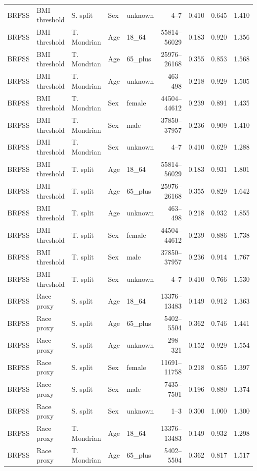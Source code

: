 \begin{longtable}{L{0.9cm}L{1.55cm}L{1.45cm}L{1.1cm}L{1.8cm}r r r r}
BRFSS & BMI threshold & S. split & Sex & unknown & 4--7 & 0.410 & 0.645 & 1.410 \\
BRFSS & BMI threshold & T. Mondrian & Age & 18\_64 & 55814--56029 & 0.183 & 0.920 & 1.356 \\
BRFSS & BMI threshold & T. Mondrian & Age & 65\_plus & 25976--26168 & 0.355 & 0.853 & 1.568 \\
BRFSS & BMI threshold & T. Mondrian & Age & unknown & 463--498 & 0.218 & 0.929 & 1.505 \\
BRFSS & BMI threshold & T. Mondrian & Sex & female & 44504--44612 & 0.239 & 0.891 & 1.435 \\
BRFSS & BMI threshold & T. Mondrian & Sex & male & 37850--37957 & 0.236 & 0.909 & 1.410 \\
BRFSS & BMI threshold & T. Mondrian & Sex & unknown & 4--7 & 0.410 & 0.629 & 1.288 \\
BRFSS & BMI threshold & T. split & Age & 18\_64 & 55814--56029 & 0.183 & 0.931 & 1.801 \\
BRFSS & BMI threshold & T. split & Age & 65\_plus & 25976--26168 & 0.355 & 0.829 & 1.642 \\
BRFSS & BMI threshold & T. split & Age & unknown & 463--498 & 0.218 & 0.932 & 1.855 \\
BRFSS & BMI threshold & T. split & Sex & female & 44504--44612 & 0.239 & 0.886 & 1.738 \\
BRFSS & BMI threshold & T. split & Sex & male & 37850--37957 & 0.236 & 0.914 & 1.767 \\
BRFSS & BMI threshold & T. split & Sex & unknown & 4--7 & 0.410 & 0.766 & 1.530 \\
BRFSS & Race proxy & S. split & Age & 18\_64 & 13376--13483 & 0.149 & 0.912 & 1.363 \\
BRFSS & Race proxy & S. split & Age & 65\_plus & 5402--5504 & 0.362 & 0.746 & 1.441 \\
BRFSS & Race proxy & S. split & Age & unknown & 298--321 & 0.152 & 0.929 & 1.554 \\
BRFSS & Race proxy & S. split & Sex & female & 11691--11758 & 0.218 & 0.855 & 1.397 \\
BRFSS & Race proxy & S. split & Sex & male & 7435--7501 & 0.196 & 0.880 & 1.374 \\
BRFSS & Race proxy & S. split & Sex & unknown & 1--3 & 0.300 & 1.000 & 1.300 \\
BRFSS & Race proxy & T. Mondrian & Age & 18\_64 & 13376--13483 & 0.149 & 0.932 & 1.298 \\
BRFSS & Race proxy & T. Mondrian & Age & 65\_plus & 5402--5504 & 0.362 & 0.817 & 1.517 \\

\end{longtable}
